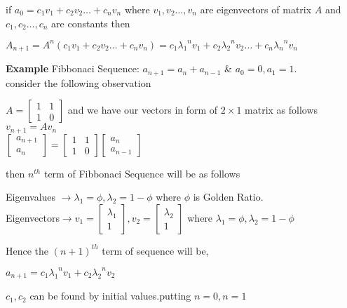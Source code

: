 \documentclass[a4paper,11pt]{article}
\numberwithin{equation}{section}
\begin{document}
\begin{itemize}
if $a_0=c_1v_1+c_2v_2\dots+c_nv_n$ where $v_1,v_2\dots,v_n$ are eigenvectors of matrix $A$ and $c_1,c_2\dots,c_n$ are constants then 
\begin{center}
    $A_{n+1}=A^n(c_1v_1+c_2v_2\dots+c_nv_n)=c_1{\lambda_1}^nv_1+c_2{\lambda_2}^nv_2\dots+c_n{\lambda_n}^nv_n$
\end{center}
\textbf{Example} Fibbonaci Sequence: $a_{n+1}=a_n+a_{n-1}$ \& $a_0=0,a_1=1$.\\
consider the following observation
\begin{center}
    $A=\begin{bmatrix}
        1&1\\1&0
    \end{bmatrix}$
    and we have our vectors in form of $2\times 1$ matrix as follows\\
    $v_{n+1}=Av_n$\\
    \vspace{10pt}
    $\begin{bmatrix}
        a_{n+1}\\a_n
    \end{bmatrix}=
    \begin{bmatrix}
        1&1\\1&0
    \end{bmatrix}
    \begin{bmatrix}
        a_{n}\\a_{n-1}
    \end{bmatrix}$
\end{center}

then $n^{th}$ term of Fibbonaci Sequence will be as follows
\begin{center}
    Eigenvalues $\rightarrow \lambda_1=\phi,\lambda_2=1-\phi$ where $\phi$ is Golden Ratio.\\
    \vspace{0.3cm}
    Eigenvectors$\rightarrow v_1=\begin{bmatrix}
        \lambda_1\\1
    \end{bmatrix},v_2=\begin{bmatrix}
        \lambda_2\\1
    \end{bmatrix}$ where $\lambda_1=\phi,\lambda_2=1-\phi$
\end{center}
Hence the $(n+1)^{th}$ term of sequence will be,
\begin{center}
    $a_{n+1}=c_1{\lambda_1}^nv_1+c_2{\lambda_2}^nv_2$
\end{center}
$c_1,c_2$ can be found by initial values.putting $n=0,n=1$\\


\end{itemize}
\end{document}
